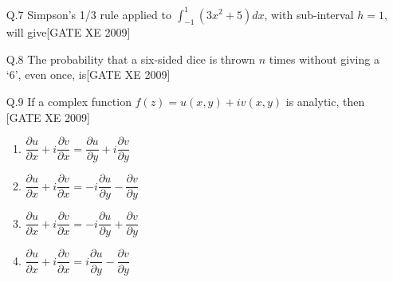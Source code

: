 \documentclass[journal,12pt,onecolumn]{IEEEtran}
\theoremstyle{remark}
\begin{document}
\begin{enumerate}
\item[Q.7] Simpson's 1/3 rule applied to $\int_{-1}^1 (3x^2 + 5)dx$, with sub-interval $h=1$, will give\hfill[GATE XE 2009]
\begin{enumerate}
 \end{enumerate}   

\item[Q.8] The probability that a six-sided dice is thrown $n$ times without giving a `6', even once, is\hfill[GATE XE 2009]
    \begin{enumerate}
 \end{enumerate}   

\item[Q.9]If a complex function $f(z) = u(x, y) + i v(x, y)$ is analytic, then \hfill[GATE XE 2009]
      \begin{multicols}{2}
\begin{enumerate}
 

           \item     $\dfrac{\partial u}{\partial x} + i \dfrac{\partial v}{\partial x} = \dfrac{\partial u}{\partial y} + i \dfrac{\partial v}{\partial y}$ 
       \item  $\dfrac{\partial u}{\partial x} + i \dfrac{\partial v}{\partial x} = -i\dfrac{\partial u}{\partial y} - \dfrac{\partial v}{\partial y}$ 
         \item $\dfrac{\partial u}{\partial x} + i \dfrac{\partial v}{\partial x} = -i\dfrac{\partial u}{\partial y} + \dfrac{\partial v}{\partial y}$ 
        \item     $\dfrac{\partial u}{\partial x} + i \dfrac{\partial v}{\partial x} = i\dfrac{\partial u}{\partial y} - \dfrac{\partial v}{\partial y}$ 
    \end{enumerate}
 \end{multicols}


\end{enumerate}
\end{document}
